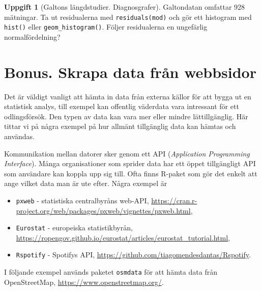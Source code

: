\documentclass[
]{book}
\providecommand{\tightlist}{%
  \setlength{\itemsep}{0pt}\setlength{\parskip}{0pt}}
\theoremstyle{definition}
\theoremstyle{definition}
\theoremstyle{definition}
\newtheorem{exercise}{Uppgift}[chapter]
\theoremstyle{definition}
\theoremstyle{remark}
\begin{document}
\begin{exercise}[Galtons längdstudier. Diagnosgrafer]
Galtondatan omfattar 928 mätningar. Ta ut residualerna med \texttt{residuals(mod)} och gör ett histogram med \texttt{hist()} eller \texttt{geom\_histogram()}. Följer residualerna en ungefärlig normalfördelning?
\end{exercise}

\hypertarget{bonus.-skrapa-data-fruxe5n-webbsidor}{%
\section{Bonus. Skrapa data från webbsidor}\label{bonus.-skrapa-data-fruxe5n-webbsidor}}

Det är väldigt vanligt att hämta in data från externa källor för att bygga ut en statistisk analys, till exempel kan offentlig väderdata vara intressant för ett odlingsförsök. Den typen av data kan vara mer eller mindre lättillgänglig. Här tittar vi på några exempel på hur allmänt tillgänglig data kan hämtas och användas.

Kommunikation mellan datorer sker genom ett API (\emph{Application Programming Interface}). Många organisationer som sprider data har ett öppet tillgängligt API som användare kan koppla upp sig till. Ofta finns R-paket som gör det enkelt att ange vilket data man är ute efter. Några exempel är

\begin{itemize}
\tightlist
\item
  \texttt{pxweb} - statistiska centralbyråns web-API, \url{https://cran.r-project.org/web/packages/pxweb/vignettes/pxweb.html},
\item
  \texttt{Eurostat} - europeiska statistikbyrån, \url{https://ropengov.github.io/eurostat/articles/eurostat_tutorial.html},
\item
  \texttt{Rspotify} - Spotifys API, \url{https://github.com/tiagomendesdantas/Rspotify}.
\end{itemize}

I följande exempel används paketet \texttt{osmdata} för att hämta data från OpenStreetMap, \url{https://www.openstreetmap.org/}.
\end{document}
